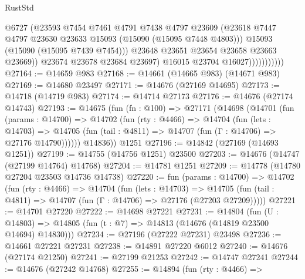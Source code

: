 \begin{lexlean}{RustStd}
\begin{coremodule}
                                @6727
                                (@23593
                                  @7454
                                  @7461
                                  @4791
                                  @7438
                                  @4797
                                  @23609
                                  (@23618
                                    @7447
                                    @4797
                                    @23630
                                    @23633
                                    @15093
                                    (@15090 (@15095 @7448 @4803)))
                                  @15093
                                  (@15090 (@15095 @7439 @7454)))
                                @23648
                                @23651
                                @23654
                                @23658
                                @23663
                                @23669))
                            @23674
                            @23678
                            @23684
                            @23697)
                          @16015
                          @23704
                          @16027)))))))))))
@27164 := @14659 @983
@27168 := @14661 (@14665 @983) (@14671 @983)
@27169 := @14680 @23497
@27171 := @14676 (@27169 @14695)
@27173 := @14718 (@14719 @983)
@27174 := @14714 @27173
@27176 := @14676 (@27174 @14743)
@27193 := @14675
    (fun (fn : @100) =>
    @27171
      (@14698
        (@14701
          (fun (params : @14700) =>
          @14702
            (fun (rty : @4466) =>
            @14704
              (fun (lets : @14703) =>
              @14705 (fun (tail : @4811) => @14707 (fun (Γ : @14706) => @27176 @14790))))))
        @14836))
    @1251
@27196 := @14842 (@27169 (@14693 @1251))
@27199 := @14755 (@14756 @1251) @23500
@27203 := @14676 (@14747 (@27199 @14764) @14768)
@27204 := @14781 @1251
@27209 := @14778 (@14780 @27204 @23503 @14736 @14738)
@27220 := fun (params : @14700) =>
  @14702
    (fun (rty : @4466) =>
    @14704
      (fun (lets : @14703) =>
      @14705 (fun (tail : @4811) => @14707 (fun (Γ : @14706) => @27176 (@27203 @27209)))))
@27221 := @14701 @27220
@27222 := @14698 @27221
@27231 := @14804
    (fun (U : @14803) => @14805 (fun (t : @7) => @14813 (@14676 (@14819 @23500 @14694) @14830)))
@27234 := @27196 (@27222 @27231) @23498
@27236 := @14661 @27221 @27231
@27238 := @14891 @27220 @6012
@27240 := @14676 (@27174 @21250)
@27241 := @27199 @21253
@27242 := @14747 @27241
@27244 := @14676 (@27242 @14768)
@27255 := @14894
    (fun (rty : @4466) =>

\end{coremodule}
\end{lexlean}
